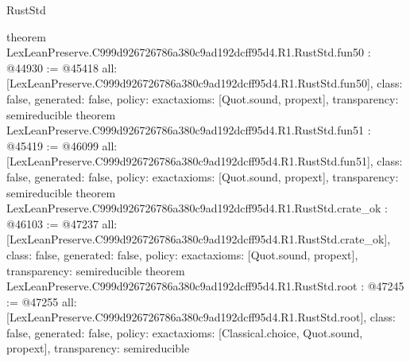 \begin{lexlean}{RustStd}
\begin{coremodule}
{}
theorem LexLeanPreserve.C999d926726786a380c9ad192dcff95d4.R1.RustStd.fun50 : @44930 := @45418 {
  all: [LexLeanPreserve.C999d926726786a380c9ad192dcff95d4.R1.RustStd.fun50],
  class: false,
  generated: false,
  policy: exact{axioms: [Quot.sound, propext]},
  transparency: semireducible
}
theorem LexLeanPreserve.C999d926726786a380c9ad192dcff95d4.R1.RustStd.fun51 : @45419 := @46099 {
  all: [LexLeanPreserve.C999d926726786a380c9ad192dcff95d4.R1.RustStd.fun51],
  class: false,
  generated: false,
  policy: exact{axioms: [Quot.sound, propext]},
  transparency: semireducible
}
theorem LexLeanPreserve.C999d926726786a380c9ad192dcff95d4.R1.RustStd.crate_ok : @46103 := @47237 {
  all: [LexLeanPreserve.C999d926726786a380c9ad192dcff95d4.R1.RustStd.crate_ok],
  class: false,
  generated: false,
  policy: exact{axioms: [Quot.sound, propext]},
  transparency: semireducible
}
theorem LexLeanPreserve.C999d926726786a380c9ad192dcff95d4.R1.RustStd.root : @47245 := @47255 {
  all: [LexLeanPreserve.C999d926726786a380c9ad192dcff95d4.R1.RustStd.root],
  class: false,
  generated: false,
  policy: exact{axioms: [Classical.choice, Quot.sound, propext]},
  transparency: semireducible
}


\end{coremodule}
\end{lexlean}
